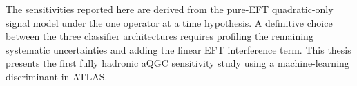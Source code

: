 The sensitivities reported here are derived from the pure-EFT quadratic-only signal model under the one operator at a time hypothesis. A definitive choice between the three classifier architectures requires profiling the remaining systematic uncertainties and adding the linear EFT interference term. This thesis presents the first fully hadronic aQGC sensitivity study using a machine-learning discriminant in ATLAS.

